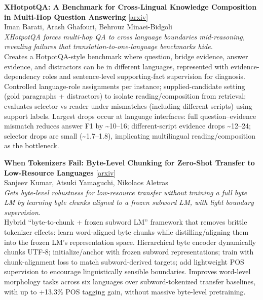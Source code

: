 \documentclass[12pt,letterpaper]{article}
\begin{document}
\medskip

{\small\textbf{XHotpotQA: A Benchmark for Cross-Lingual Knowledge Composition in Multi-Hop Question Answering}} {\scriptsize[\href{https://arxiv.org/abs/2608.27481}{arxiv}]}\\
{\scriptsize Iman Barati, Arash Ghafouri, Behrouz Minaei-Bidgoli}\\

{\small\textit{XHotpotQA forces multi-hop QA to cross language boundaries mid-reasoning, revealing failures that translation-to-one-language benchmarks hide.}}\\[1pt]
{\footnotesize Creates a HotpotQA-style benchmark where question, bridge evidence, answer evidence, and distractors can be in different languages, represented with evidence-dependency roles and sentence-level supporting-fact supervision for diagnosis. Controlled language-role assignments per instance; supplied-candidate setting (gold paragraphs + distractors) to isolate reading/composition from retrieval; evaluates selector vs reader under mismatches (including different scripts) using support labels. Largest drops occur at language interfaces: full question--evidence mismatch reduces answer F1 by \textasciitilde{}10--16; different-script evidence drops \textasciitilde{}12--24; selector drops are small (\textasciitilde{}1.7--1.8), implicating multilingual reading/composition as the bottleneck.}

\medskip

{\small\textbf{When Tokenizers Fail: Byte-Level Chunking for Zero-Shot Transfer to Low-Resource Languages}} {\scriptsize[\href{https://arxiv.org/abs/2608.27658}{arxiv}]}\\
{\scriptsize Sanjeev Kumar, Atsuki Yamaguchi, Nikolaos Aletras}\\

{\small\textit{Gets byte-level robustness for low-resource transfer without training a full byte LM by learning byte chunks aligned to a frozen subword LM, with light boundary supervision.}}\\[1pt]
{\footnotesize Hybrid ``byte-to-chunk + frozen subword LM'' framework that removes brittle tokenizer effects: learn word-aligned byte chunks while distilling/aligning them into the frozen LM's representation space. Hierarchical byte encoder dynamically chunks UTF-8; initialize/anchor with frozen subword representations; train with chunk-alignment loss to match subword-derived targets; add lightweight POS supervision to encourage linguistically sensible boundaries. Improves word-level morphology tasks across six languages over subword-tokenized transfer baselines, with up to +13.3\% POS tagging gain, without massive byte-level pretraining.}
\end{document}
